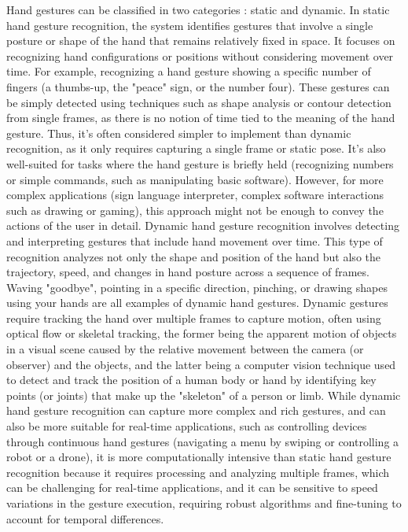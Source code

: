 \documentclass[12pt]{article}
\begin{document}
Hand gestures can be classified in two categories : static and dynamic.
In static hand gesture recognition, the system identifies gestures that involve a single posture or shape of the hand that remains relatively fixed in space. It focuses on recognizing hand configurations or positions without considering movement over time. For example, recognizing a hand gesture showing a specific number of fingers (a thumbs-up, the "peace" sign, or the number four). These gestures can be simply detected using techniques such as shape analysis or contour detection from single frames, as there is no notion of time tied to the meaning of the hand gesture.
Thus, it's often considered simpler to implement than dynamic recognition, as it only requires capturing a single frame or static pose. It's also well-suited for tasks where the hand gesture is briefly held (recognizing numbers or simple commands, such as manipulating basic software). However, for more complex applications (sign language interpreter, complex software interactions such as drawing or gaming), this approach might not be enough to convey the actions of the user in detail.
Dynamic hand gesture recognition involves detecting and interpreting gestures that include hand movement over time. This type of recognition analyzes not only the shape and position of the hand but also the trajectory, speed, and changes in hand posture across a sequence of frames. Waving "goodbye", pointing in a specific direction, pinching, or drawing shapes using your hands are all examples of dynamic hand gestures. Dynamic gestures require tracking the hand over multiple frames to capture motion, often using optical flow or skeletal tracking, the former being the apparent motion of objects in a visual scene caused by the relative movement between the camera (or observer) and the objects, and the latter being a computer vision technique used to detect and track the position of a human body or hand by identifying key points (or joints) that make up the "skeleton" of a person or limb.
While dynamic hand gesture recognition can capture more complex and rich gestures, and can also be more suitable for real-time applications, such as controlling devices through continuous hand gestures (navigating a menu by swiping or controlling a robot or a drone), it is more computationally intensive than static hand gesture recognition because it requires processing and analyzing multiple frames, which can be challenging for real-time applications, and it can be sensitive to speed variations in the gesture execution, requiring robust algorithms and fine-tuning to account for temporal differences.
\end{document}
